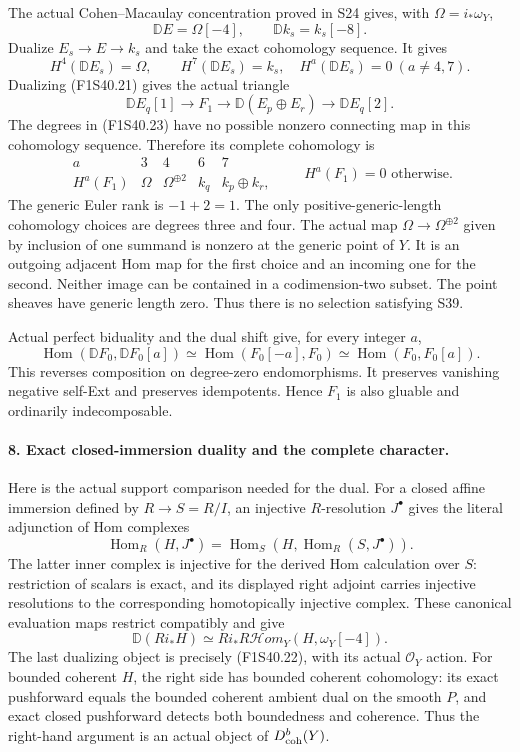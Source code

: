The actual Cohen--Macaulay concentration proved
in S24 gives, with $\Omega=i_*\omega_Y$,
\[
        \mathbb D E=\Omega[-4],\qquad
        \mathbb D k_s=k_s[-8].
 \tag{F1S40.22}
\]
Dualize $E_s\to E\to k_s$ and take the exact
cohomology sequence. It gives
\[
 H^4(\mathbb D E_s)=\Omega,\qquad
 H^7(\mathbb D E_s)=k_s,
 \quad H^a(\mathbb D E_s)=0\ (a\ne4,7).
 \tag{F1S40.23}
\]
Dualizing (F1S40.21) gives the actual triangle
\[
 \mathbb D E_q[1]\longrightarrow F_1
       \longrightarrow\mathbb D(E_p\oplus E_r)
                         \longrightarrow\mathbb D E_q[2].
 \tag{F1S40.24}
\]
The degrees in (F1S40.23) have no possible
nonzero connecting map in this cohomology
sequence. Therefore its complete cohomology is
\[
\begin{array}{c|cccc}
 a&3&4&6&7\\ \hline
 H^a(F_1)&\Omega&\Omega^{\oplus2}&k_q&k_p\oplus k_r,
\end{array}
 \qquad H^a(F_1)=0\text{ otherwise}.
 \tag{F1S40.25}
\]
The generic Euler rank is $-1+2=1$.
The only positive-generic-length cohomology
choices are degrees three and four. The actual
map $\Omega\to\Omega^{\oplus2}$ given by
inclusion of one summand is nonzero at the
generic point of $Y$. It is an outgoing
adjacent Hom map for the first choice and an
incoming one for the second. Neither image
can be contained in a codimension-two subset.
The point sheaves have generic length zero.
Thus there is no selection satisfying S39.

Actual perfect biduality and the dual shift
give, for every integer $a$,
\[
 \operatorname{Hom}(\mathbb D F_0,\mathbb D F_0[a])
    \simeq\operatorname{Hom}(F_0[-a],F_0)
    \simeq\operatorname{Hom}(F_0,F_0[a]).
 \tag{F1S40.26}
\]
This reverses composition on degree-zero
endomorphisms.
It preserves vanishing negative self-Ext and
preserves idempotents. Hence $F_1$ is also
gluable and ordinarily indecomposable.

\paragraph{8. Exact closed-immersion duality and the complete character.}
Here is the actual support comparison needed
for the dual. For a closed affine immersion
defined by $R\to S=R/I$, an injective
$R$-resolution $J^\bullet$ gives the literal
adjunction of Hom complexes
\[
 \operatorname{Hom}_R(H,J^\bullet)
    =\operatorname{Hom}_S
        (H,\operatorname{Hom}_R(S,J^\bullet)).
 \tag{F1S40.27}
\]
The latter inner complex is injective for the
derived Hom calculation over $S$: restriction
of scalars is exact, and its displayed right
adjoint carries injective resolutions to the
corresponding homotopically injective complex.
These canonical evaluation maps restrict
compatibly and give
\[
 \mathbb D(Ri_*H)
       \simeq Ri_*R\mathcal Hom_Y(H,\omega_Y[-4]).
 \tag{F1S40.28}
\]
The last dualizing object is precisely
(F1S40.22), with its actual $\mathcal O_Y$
action. For bounded coherent $H$, the right
side has bounded coherent cohomology: its
exact pushforward equals the bounded coherent
ambient dual on the smooth $P$, and exact
closed pushforward detects both boundedness
and coherence. Thus the right-hand argument
is an actual object of $D^b_{\rm coh}(Y)$.

